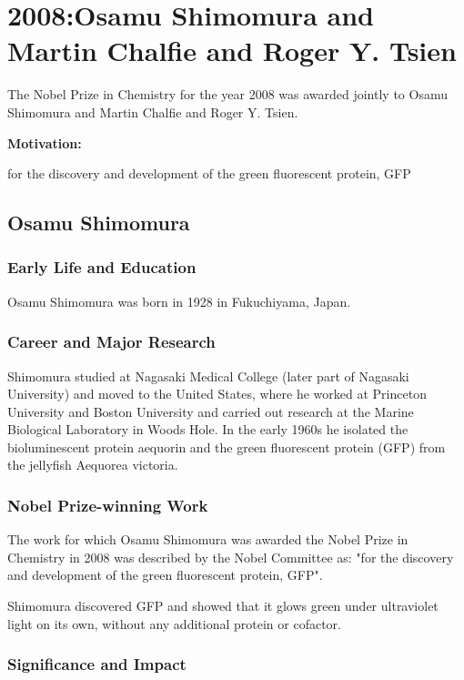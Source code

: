\chapter{2008:Osamu Shimomura and Martin Chalfie and Roger Y. Tsien}

\label{chap:chemistry2008}

The Nobel Prize in Chemistry for the year 2008 was awarded jointly to Osamu Shimomura and Martin Chalfie and Roger Y. Tsien.

\textbf{Motivation:}

for the discovery and development of the green fluorescent protein, GFP

\section{Osamu Shimomura}

\subsection*{Early Life and Education}

Osamu Shimomura was born in 1928 in Fukuchiyama, Japan.

\subsection*{Career and Major Research}

Shimomura studied at Nagasaki Medical College (later part of Nagasaki University) and moved to the United States, where he worked at Princeton University and Boston University and carried out research at the Marine Biological Laboratory in Woods Hole. In the early 1960s he isolated the bioluminescent protein aequorin and the green fluorescent protein (GFP) from the jellyfish Aequorea victoria.

\subsection*{Nobel Prize-winning Work}

The work for which Osamu Shimomura was awarded the Nobel Prize in Chemistry in 2008 was described by the Nobel Committee as: "for the discovery and development of the green fluorescent protein, GFP".

Shimomura discovered GFP and showed that it glows green under ultraviolet light on its own, without any additional protein or cofactor.

\subsection*{Significance and Impact}

